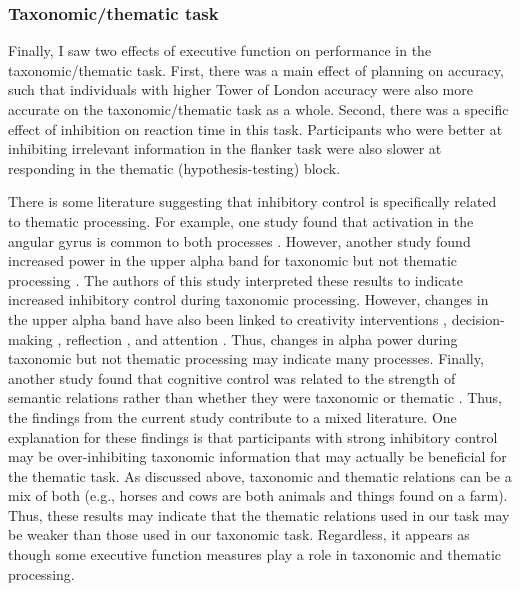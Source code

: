 \documentclass[../dissertation.tex]{subfiles}
\begin{document}
\subsubsection{Taxonomic/thematic task}
	Finally, I saw two effects of executive function on performance in the taxonomic/thematic task. First, there was a main effect of planning on accuracy, such that individuals with higher Tower of London accuracy were also more accurate on the taxonomic/thematic task as a whole. Second, there was a specific effect of inhibition on reaction time in this task. Participants who were better at inhibiting irrelevant information in the flanker task were also slower at responding in the thematic (hypothesis-testing) block. \par
	 There is some literature suggesting that inhibitory control is specifically related to thematic processing. For example, one study found that activation in the angular gyrus is common to both processes \citep{Lewis2018}. However, another study found increased power in the upper alpha band for taxonomic but not thematic processing \citep{Maguire2010}. The authors of this study interpreted these results to indicate increased inhibitory control during taxonomic processing. However, changes in the upper alpha band have also been linked to creativity interventions \citep{Fink2011}, decision-making \citep{Fink2018}, reflection \citep{Rominger2017}, and attention \citep{VanderLubbe2019}. Thus, changes in alpha power during taxonomic but not thematic processing may indicate many processes. Finally, another study found that cognitive control was related to the strength of semantic relations rather than whether they were taxonomic or thematic \citep{Geller2019}. Thus, the findings from the current study contribute to a mixed literature. One explanation for these findings is that participants with strong inhibitory control may be over-inhibiting taxonomic information that may actually be beneficial for the thematic task. As discussed above, taxonomic and thematic relations can be a mix of both (e.g., horses and cows are both animals and things found on a farm). Thus, these results may indicate that the thematic relations used in our task may be weaker than those used in our taxonomic task. Regardless, it appears as though some executive function measures play a role in taxonomic and thematic processing. \par
\end{document}
